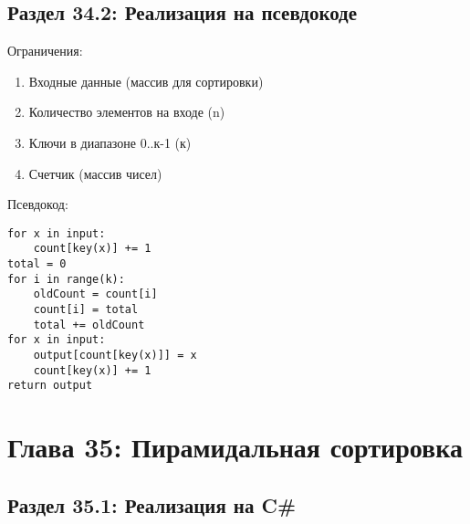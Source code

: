 \section*{Раздел 34.2: Реализация на псевдокоде} 

\vspace{\baselineskip}
Ограничения:

\vspace{\baselineskip}
\begin{enumerate}
\item Входные данные (массив для сортировки)
\item Количество элементов на входе (n)
\item Ключи в диапазоне 0..к-1 (к)
\item Счетчик (массив чисел)
\end{enumerate}

\vspace{\baselineskip}
Псевдокод:

\vspace{\baselineskip}
\begin{tcolorbox}
\begin{verbatim} 
for x in input:
    count[key(x)] += 1
total = 0
for i in range(k):
    oldCount = count[i]
    count[i] = total
    total += oldCount
for x in input:
    output[count[key(x)]] = x
    count[key(x)] += 1
return output
\end{verbatim}
\end{tcolorbox}

\chapter*{Глава 35: Пирамидальная сортировка}
\section*{Раздел 35.1: Реализация на C\#} 

